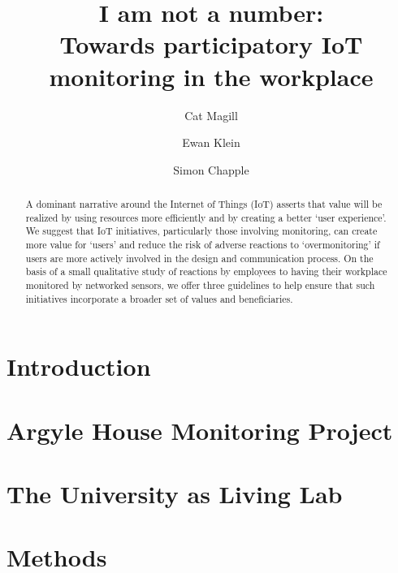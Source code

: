 \documentclass[10pt,twocolumn]{article}
\begin{document}
\title{\bfseries\LARGE  I am not a number:\\
Towards participatory IoT monitoring in the workplace}

\author[*]{Cat Magill}
\author[*]{Ewan Klein}
\author[$\dagger$]{Simon Chapple}
\date{}

\maketitle

\begin{abstract}
A dominant narrative around the Internet of Things (IoT) asserts that
value will be realized by using resources more efficiently and by
creating a better ‘user experience’.  We suggest that IoT initiatives,
particularly those involving monitoring, can create more value for
`users' and reduce the risk of adverse reactions to `overmonitoring'
if users are more actively involved in the design and communication
process.  On the basis of a small qualitative study of reactions by
employees to having their workplace monitored by networked sensors, we
offer three guidelines to help ensure that such initiatives
incorporate a broader set of values and beneficiaries. 
\end{abstract}



\section{Introduction}
\label{sec:introduction}



\section{Argyle House Monitoring Project}
\label{sec:argyle-house}



\section{The University as Living Lab}
\label{sec:university-as-ll}



\section{Methods}
\label{sec:methods}
\end{document}
